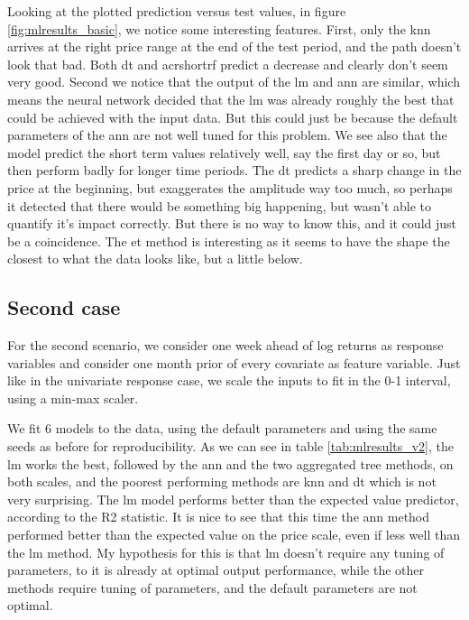 Looking at the plotted prediction versus test values, in figure \ref{fig:mlresults_basic}, we notice some interesting features. First, only the \acrshort{knn} arrives at the right price range at the end of the test period, and the path doesn't look that bad. Both \acrshort{dt} and acrshort{rf} predict a decrease and clearly don't seem very good.
Second we notice that the output of the \acrshort{lm} and \acrshort{ann} are similar, which means the neural network decided that the \acrlong{lm} was already roughly the best that could be achieved with the input data. But this could just be because the default parameters of the \acrshort{ann} are not well tuned for this problem. We see also that the model predict the short term values relatively well, say the first day or so, but then perform badly for longer time periods.
The \acrshort{dt} predicts a sharp change in the price at the beginning, but exaggerates the amplitude way too much, so perhaps it detected that there would be something big happening, but wasn't able to quantify it's impact correctly. But there is no way to know this, and it could just be a coincidence. The \acrshort{et} method is interesting as it seems to have the shape the closest to what the data looks like, but a little below.

\subsection{Second case}
For the second scenario, we consider one week ahead of log returns as response variables and consider one month prior of every covariate as feature variable.
Just like in the univariate response case, we scale the inputs to fit in the 0-1 interval, using a min-max scaler.



We fit 6 models to the data, using the default parameters and using the same seeds as before for reproducibility.
As we can see in table \ref{tab:mlresults_v2}, the \acrshort{lm} works the best, followed by the \acrshort{ann} and the two aggregated tree methods, on both scales, and the poorest performing methods are \acrshort{knn} and \acrshort{dt} which is not very surprising. The \acrshort{lm} model performs better than the expected value predictor, according to the \Gls{R2} statistic. It is nice to see that this time the \acrshort{ann} method performed better than the expected value on the price scale, even if less well than the \acrshort{lm} method. My hypothesis for this is that \acrshort{lm} doesn't require any tuning of parameters, to it is already at optimal output performance, while the other methods require tuning of parameters, and the default parameters are not optimal.

